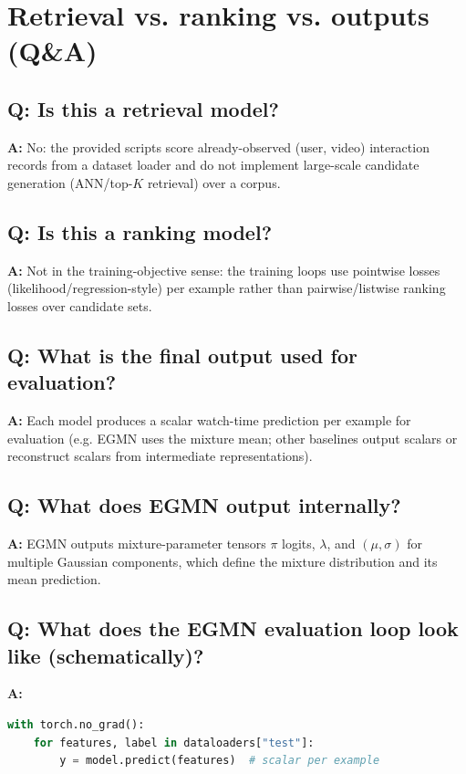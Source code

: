 \section{Retrieval vs. ranking vs. outputs (Q\&A)}

\subsection{Q: Is this a retrieval model?}
\noindent\textbf{A:} No: the provided scripts score already-observed (user, video) interaction records from a dataset loader and do not implement large-scale candidate generation (ANN/top-$K$ retrieval) over a corpus.

\subsection{Q: Is this a ranking model?}
\noindent\textbf{A:} Not in the training-objective sense: the training loops use pointwise losses (likelihood/regression-style) per example rather than pairwise/listwise ranking losses over candidate sets.

\subsection{Q: What is the final output used for evaluation?}
\noindent\textbf{A:} Each model produces a scalar watch-time prediction per example for evaluation (e.g. EGMN uses the mixture mean; other baselines output scalars or reconstruct scalars from intermediate representations).

\subsection{Q: What does EGMN output internally?}
\noindent\textbf{A:} EGMN outputs mixture-parameter tensors \(\pi\) logits, \(\lambda\), and \((\mu,\sigma)\) for multiple Gaussian components, which define the mixture distribution and its mean prediction.

\subsection{Q: What does the EGMN evaluation loop look like (schematically)?}
\noindent\textbf{A:}
\begin{lstlisting}[language=Python]
with torch.no_grad():
    for features, label in dataloaders["test"]:
        y = model.predict(features)  # scalar per example
\end{lstlisting}

